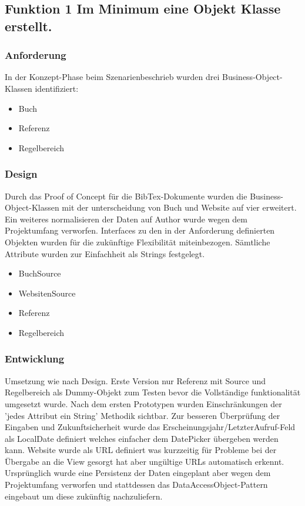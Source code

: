\subsection[Funktion 1 Objektklassen]{Funktion 1 Im Minimum eine Objekt Klasse erstellt.}

\subsubsection{Anforderung}
In der Konzept-Phase beim Szenarienbeschrieb wurden drei Business-Object-Klassen identifiziert:
\begin{itemize}
	\item Buch
	\item Referenz
	\item Regelbereich
\end{itemize}

\subsubsection{Design}
Durch das Proof of Concept für die BibTex-Dokumente wurden die Business-Object-Klassen mit der unterscheidung von Buch und Website auf vier erweitert.\\
Ein weiteres normalisieren der Daten auf Author wurde wegen dem Projektumfang verworfen. Interfaces zu den in der Anforderung definierten Objekten wurden für die zukünftige Flexibilität miteinbezogen. Sämtliche Attribute wurden zur Einfachheit als Strings festgelegt.
\begin{itemize}
	\item BuchSource
	\item WebsitenSource
	\item Referenz
	\item Regelbereich
\end{itemize}

\subsubsection{Entwicklung}
Umsetzung wie nach Design. Erste Version nur Referenz mit Source und Regelbereich als Dummy-Objekt zum Testen bevor die Vollständige funktionalität umgesetzt wurde. Nach dem ersten Prototypen wurden Einschränkungen der 'jedes Attribut ein String' Methodik sichtbar. Zur besseren Überprüfung der Eingaben und Zukunftsicherheit wurde das Erscheinungsjahr/LetzterAufruf-Feld als LocalDate definiert welches einfacher dem DatePicker übergeben werden kann. Website wurde als URL definiert was kurzzeitig für Probleme bei der Übergabe an die View gesorgt hat aber ungültige URLs automatisch erkennt. Ursprünglich wurde eine Persistenz der Daten eingeplant aber wegen dem Projektumfang verworfen und stattdessen das DataAccessObject-Pattern eingebaut um diese zukünftig nachzuliefern.

